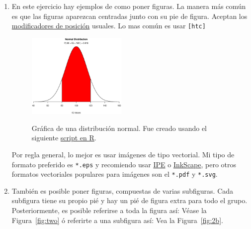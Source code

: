 \begin{enumerate}
 \item En este ejercicio hay ejemplos de como poner figuras.
La manera más común es que las figuras aparezcan centradas junto con su pie de figura.
Aceptan los \href{https://en.wikibooks.org/wiki/LaTeX/Floats,_Figures_and_Captions#Figures}{modificadores de posición} usuales.
Lo mas común es usar \texttt{[htc]}
 
\begin{figure}[htb]
  \centering
  \includegraphics[width=0.45\textwidth]{img/normal}
  \label{fig:one}
\caption[Distribución normal]{Gráfica de una distribución normal. Fue creado usando el siguiente \href{https://www.statmethods.net/advgraphs/probability.html}{script en R}.}
\end{figure}

Por regla general, lo mejor es usar imágenes de tipo vectorial.
Mi tipo de formato preferido es \verb|*.eps| y recomiendo usar \href{https://ipe.otfried.org/}{IPE} o \href{https://inkscape.org/}{InkScape}, pero otros formatos vectoriales populares para imágenes son el \verb|*.pdf| y \verb|*.svg|.

\item También es posible poner figuras, compuestas de varias subfiguras.
Cada subfigura tiene su propio pié y hay un pié de figura extra para todo el grupo.
Posteriormente, es posible referirse a toda la figura así: Véase la  Figura~\ref{fig:two} ó referirte a una subfigura así:
Vea la Figura~\ref{fig:2b}.


\end{enumerate}
